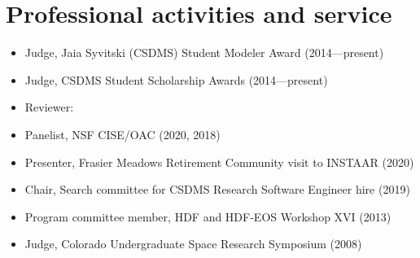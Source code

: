 \section{Professional activities and service}
\vspace{0.5em}

\begin{itemize}

  \item Judge, Jaia Syvitski (CSDMS) Student Modeler Award (2014---present)

  \item Judge, CSDMS Student Scholarship Awards (2014---present)

  \item Reviewer:

  \item Panelist, NSF CISE/OAC (2020, 2018)

  \item Presenter, Frasier Meadows Retirement Community visit to INSTAAR (2020)

  \item Chair, Search committee for CSDMS Research Software Engineer hire (2019)

  \item Program committee member, HDF and HDF-EOS Workshop XVI (2013)

  \item Judge, Colorado Undergraduate Space Research Symposium (2008)

\end{itemize}
